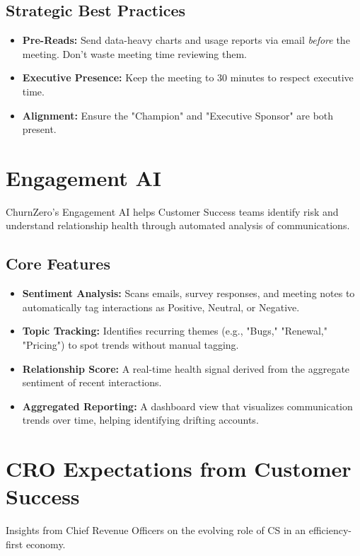 \documentclass[12pt,a4paper]{article}
\begin{document}
\subsection{Strategic Best Practices}
\begin{itemize}
    \item \textbf{Pre-Reads:} Send data-heavy charts and usage reports via email \textit{before} the meeting. Don't waste meeting time reviewing them.
    \item \textbf{Executive Presence:} Keep the meeting to 30 minutes to respect executive time.
    \item \textbf{Alignment:} Ensure the "Champion" and "Executive Sponsor" are both present.
\end{itemize}

\section{Engagement AI}
ChurnZero's Engagement AI helps Customer Success teams identify risk and understand relationship health through automated analysis of communications.

\subsection{Core Features}
\begin{itemize}
    \item \textbf{Sentiment Analysis:} Scans emails, survey responses, and meeting notes to automatically tag interactions as Positive, Neutral, or Negative.
    \item \textbf{Topic Tracking:} Identifies recurring themes (e.g., "Bugs," "Renewal," "Pricing") to spot trends without manual tagging.
    \item \textbf{Relationship Score:} A real-time health signal derived from the aggregate sentiment of recent interactions.
    \item \textbf{Aggregated Reporting:} A dashboard view that visualizes communication trends over time, helping identifying drifting accounts.
\end{itemize}

\section{CRO Expectations from Customer Success}
Insights from Chief Revenue Officers on the evolving role of CS in an efficiency-first economy.
\end{document}

